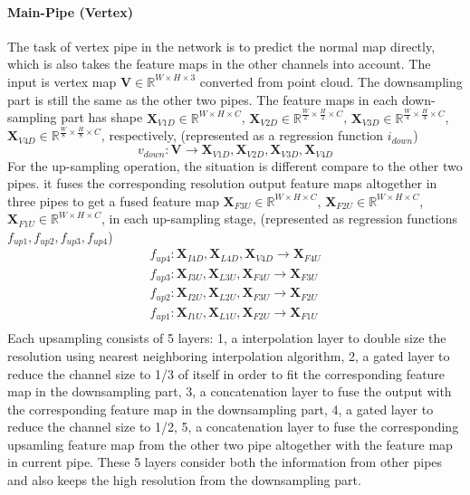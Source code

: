 \paragraph{Main-Pipe (Vertex)}
The task of vertex pipe in the network is to predict the normal map directly, which is also takes the feature maps in the other channels into account. The input is vertex map $ \textbf{V} \in \mathbb{R}^{W\times H\times 3}$ converted from point cloud. 
The downsampling part is still the same as the other two pipes. The feature maps in each down-sampling part has shape $ \textbf{X}_{V1D} \in \mathbb{R}^{{W}\times H\times C} $, 
$ \textbf{X}_{V2D} \in \mathbb{R}^{\frac{W}{2}\times \frac{H}{2}\times C} $,
$ \textbf{X}_{V3D} \in \mathbb{R}^{\frac{W}{4}\times \frac{H}{4}\times C} $,
$ \textbf{X}_{V4D} \in \mathbb{R}^{\frac{W}{8}\times \frac{H}{8}\times C} $, respectively, 
(represented as a regression function $ i_{down} $)
\[ v_{down}: \textbf{V} \rightarrow  \textbf{X}_{V1D} , \textbf{X}_{V2D}, \textbf{X}_{V3D}, \textbf{X}_{V4D} \]
For the up-sampling operation, the situation is different compare to  the other two pipes.
it fuses the corresponding resolution output feature maps altogether in three pipes to get a fused feature map 
$ \textbf{X}_{F3U} \in \mathbb{R}^{W\times H\times C} $, 
$\textbf{X}_{F2U} \in \mathbb{R}^{W\times H\times C} $, 
$\textbf{X}_{F1U} \in \mathbb{R}^{W\times H\times C} $,
in each up-sampling stage, (represented as regression functions $ f_{up1}, f_{up2}, f_{up3}, f_{up4}$)
\[ 
\begin{matrix}
	f_{up4} : \textbf{X}_{I4D}, \textbf{X}_{L4D}, \textbf{X}_{V4D} \rightarrow \textbf{X}_{F4U} \\
	f_{up3} : \textbf{X}_{I3U}, \textbf{X}_{L3U}, \textbf{X}_{F4U} \rightarrow \textbf{X}_{F3U} \\
	f_{up2} : \textbf{X}_{I2U}, \textbf{X}_{L2U}, \textbf{X}_{F3U} \rightarrow \textbf{X}_{F2U} \\
	f_{up1} : \textbf{X}_{I1U}, \textbf{X}_{L1U}, \textbf{X}_{F2U} \rightarrow \textbf{X}_{F1U} \\
			
\end{matrix}
\]
Each upsampling consists of 5 layers: 1, a interpolation layer to double size the resolution using nearest neighboring interpolation algorithm, 2, a gated layer to reduce the channel size to 1/3 of itself in order to fit the corresponding feature map in the downsampling part, 3, a concatenation layer to fuse the output with the corresponding feature map in the downsampling part, 4, a gated layer to reduce the channel size to 1/2, 5, a concatenation layer to fuse the corresponding upsamling feature map from the other two pipe altogether with the feature map in current pipe. These 5 layers consider both the information from other pipes and also keeps the high resolution from the downsampling part. 

